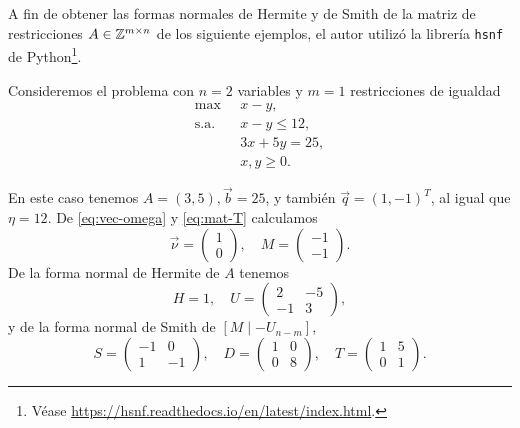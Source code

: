 A fin de obtener las formas normales de Hermite y de Smith de la matriz de restricciones $A \in
\mathbb{Z}^{m \times n}$ de los siguiente ejemplos, el autor utilizó la librería \texttt{hsnf} de
Python\footnote{
	Véase \url{https://hsnf.readthedocs.io/en/latest/index.html}.
}.
\begin{example}
	\label{ex:two-var}
	Consideremos el problema con $n = 2$ variables y $m = 1$ restricciones de igualdad
	\begin{align*}
		\max
			~& x - y, \\
		\text{s.a.} \quad
			& x - y \leq 12, \\
			& 3x + 5y = 25, \\
			& x, y \geq 0.
	\end{align*}

	En este caso tenemos $A = (3, 5), \vec{b} = 25$, y también $\vec{q} = (1, -1)^T$, al igual que
	$\eta = 12$. De \eqref{eq:vec-omega} y \eqref{eq:mat-T} calculamos
	\begin{equation*}
		\vec{\nu} = \begin{pmatrix} 1 \\ 0 \end{pmatrix},\quad
		M = \begin{pmatrix} -1 \\ -1 \end{pmatrix}.
	\end{equation*}
	De la forma normal de Hermite de $A$ tenemos
	\begin{equation*}
		H = 1,\quad U = \begin{pmatrix} 2 & -5 \\ -1 & 3 \end{pmatrix},
	\end{equation*}
	y de la forma normal de Smith de $[M \mid -U_{n-m}]$,
	\begin{equation*}
		S = \begin{pmatrix} -1 & 0 \\ 1 & -1 \end{pmatrix},\quad
		D = \begin{pmatrix} 1 & 0 \\ 0 & 8 \end{pmatrix},\quad
		T = \begin{pmatrix} 1 & 5 \\ 0 & 1 \end{pmatrix}. 
	\end{equation*}


\end{example}
